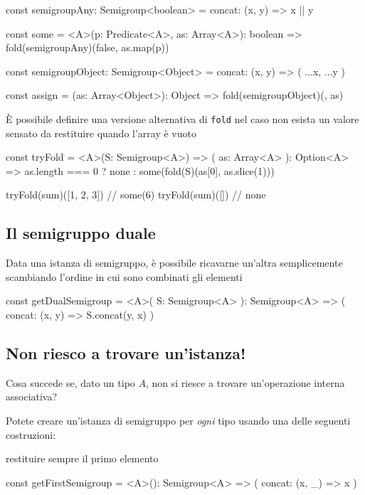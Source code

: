 \documentclass[12pt]{article}
\theoremstyle{definition}
\newenvironment{code}
  {\vspace{0.5cm} \VerbatimEnvironment\begin{typescriptcode}}
  {\end{typescriptcode} \vspace{0.2cm}}
\begin{document}
\begin{code}
const semigroupAny: Semigroup<boolean> = {
  concat: (x, y) => x || y
}

const some = <A>(p: Predicate<A>, as: Array<A>): boolean =>
  fold(semigroupAny)(false, as.map(p))
\end{code}

\begin{code}
const semigroupObject: Semigroup<Object> = {
  concat: (x, y) => ({ ...x, ...y })
}

const assign = (as: Array<Object>): Object =>
  fold(semigroupObject)({}, as)
\end{code}

È possibile definire una versione alternativa di \texttt{fold} nel caso non esista un valore sensato da restituire quando l'array è vuoto

\begin{code}
const tryFold = <A>(S: Semigroup<A>) => (
  as: Array<A>
): Option<A> =>
  as.length === 0 ? none : some(fold(S)(as[0], as.slice(1)))

tryFold(sum)([1, 2, 3]) // some(6)
tryFold(sum)([]) // none
\end{code}

\subsection{Il semigruppo duale}

Data una istanza di semigruppo, è possibile ricavarne un'altra semplicemente scambiando l'ordine in cui sono combinati gli elementi

\begin{code}
const getDualSemigroup = <A>(
  S: Semigroup<A>
): Semigroup<A> => ({
  concat: (x, y) => S.concat(y, x)
})
\end{code}

\subsection{Non riesco a trovare un'istanza!}

Cosa succede se, dato un tipo $A$, non si riesce a trovare un'operazione interna associativa?

Potete creare un'istanza di semigruppo per \emph{ogni} tipo usando una delle seguenti costruzioni:

restituire sempre il primo elemento

\begin{code}
const getFirstSemigroup = <A>(): Semigroup<A> => ({
  concat: (x, _) => x
})
\end{code}
\end{document}
